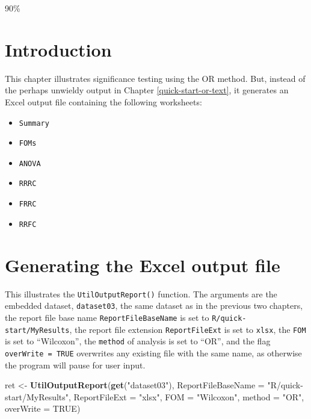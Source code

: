 \documentclass[
]{book}
\newenvironment{Shaded}{\begin{snugshade}}{\end{snugshade}}
\newcommand{\DataTypeTok}[1]{\textcolor[rgb]{0.13,0.29,0.53}{#1}}
\newcommand{\KeywordTok}[1]{\textcolor[rgb]{0.13,0.29,0.53}{\textbf{#1}}}
\newcommand{\NormalTok}[1]{#1}
\newcommand{\OtherTok}[1]{\textcolor[rgb]{0.56,0.35,0.01}{#1}}
\newcommand{\StringTok}[1]{\textcolor[rgb]{0.31,0.60,0.02}{#1}}
\providecommand{\tightlist}{%
  \setlength{\itemsep}{0pt}\setlength{\parskip}{0pt}}
\begin{document}
90\%

\hypertarget{quick-start-or-excel-intro}{%
\section{Introduction}\label{quick-start-or-excel-intro}}

This chapter illustrates significance testing using the OR method. But, instead of the perhaps unwieldy output in Chapter \ref{quick-start-or-text}, it generates an Excel output file containing the following worksheets:

\begin{itemize}
\tightlist
\item
  \texttt{Summary}
\item
  \texttt{FOMs}
\item
  \texttt{ANOVA}
\item
  \texttt{RRRC}
\item
  \texttt{FRRC}
\item
  \texttt{RRFC}
\end{itemize}

\hypertarget{quick-start-or-excel-output}{%
\section{Generating the Excel output file}\label{quick-start-or-excel-output}}

This illustrates the \texttt{UtilOutputReport()} function. The arguments are the embedded dataset, \texttt{dataset03}, the same dataset as in the previous two chapters, the report file base name \texttt{ReportFileBaseName} is set to \texttt{R/quick-start/MyResults}, the report file extension \texttt{ReportFileExt} is set to \texttt{xlsx}, the \texttt{FOM} is set to ``Wilcoxon'', the \texttt{method} of analysis is set to ``OR'', and the flag \texttt{overWrite\ =\ TRUE} overwrites any existing file with the same name, as otherwise the program will pause for user input.

\begin{Shaded}
\begin{Highlighting}[]
\NormalTok{ret <-}\StringTok{ }\KeywordTok{UtilOutputReport}\NormalTok{(}\KeywordTok{get}\NormalTok{(}\StringTok{"dataset03"}\NormalTok{), }
                        \DataTypeTok{ReportFileBaseName =} \StringTok{"R/quick-start/MyResults"}\NormalTok{, }
                        \DataTypeTok{ReportFileExt =} \StringTok{"xlsx"}\NormalTok{,  }
                        \DataTypeTok{FOM =} \StringTok{"Wilcoxon"}\NormalTok{, }
                        \DataTypeTok{method =} \StringTok{"OR"}\NormalTok{, }
                        \DataTypeTok{overWrite =} \OtherTok{TRUE}\NormalTok{)}
\end{Highlighting}
\end{Shaded}
\end{document}
